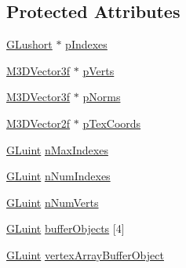 \subsection*{Protected Attributes}
\begin{DoxyCompactItemize}
\item 
\hyperlink{_g_l_e_w_2glew_8h_ac995a558f6571eb5f98b7a6d2b2a4468}{G\-Lushort} $\ast$ \hyperlink{class_g_l_triangle_batch_a1eb176aae90befb77ae323f110631d50}{p\-Indexes}
\item 
\hyperlink{math3d_8h_a2163fe22bd4208b846d22ec7e74cf858}{M3\-D\-Vector3f} $\ast$ \hyperlink{class_g_l_triangle_batch_a040c2d279e77f6eaa449cb0ec0c2329f}{p\-Verts}
\item 
\hyperlink{math3d_8h_a2163fe22bd4208b846d22ec7e74cf858}{M3\-D\-Vector3f} $\ast$ \hyperlink{class_g_l_triangle_batch_ae818927c49404e704745551a6efe4168}{p\-Norms}
\item 
\hyperlink{math3d_8h_a53c353d9bb3250cff53ebefe75cc8013}{M3\-D\-Vector2f} $\ast$ \hyperlink{class_g_l_triangle_batch_ae80850292b9b9e2e3c93142e22412bc6}{p\-Tex\-Coords}
\item 
\hyperlink{_g_l_e_w_2glew_8h_a68c4714e43d8e827d80759f9cb864f3c}{G\-Luint} \hyperlink{class_g_l_triangle_batch_ad71adff46009cbdbea504bc8df3e6483}{n\-Max\-Indexes}
\item 
\hyperlink{_g_l_e_w_2glew_8h_a68c4714e43d8e827d80759f9cb864f3c}{G\-Luint} \hyperlink{class_g_l_triangle_batch_aa898172f3199fe04a570162affe65742}{n\-Num\-Indexes}
\item 
\hyperlink{_g_l_e_w_2glew_8h_a68c4714e43d8e827d80759f9cb864f3c}{G\-Luint} \hyperlink{class_g_l_triangle_batch_abdf5887a9f634e0a649590c0de136c59}{n\-Num\-Verts}
\item 
\hyperlink{_g_l_e_w_2glew_8h_a68c4714e43d8e827d80759f9cb864f3c}{G\-Luint} \hyperlink{class_g_l_triangle_batch_a16b051587157194229a7e0f9c0eacebb}{buffer\-Objects} \mbox{[}4\mbox{]}
\item 
\hyperlink{_g_l_e_w_2glew_8h_a68c4714e43d8e827d80759f9cb864f3c}{G\-Luint} \hyperlink{class_g_l_triangle_batch_a72f1061415939f50c49b3cf35a1dccd4}{vertex\-Array\-Buffer\-Object}
\end{DoxyCompactItemize}


